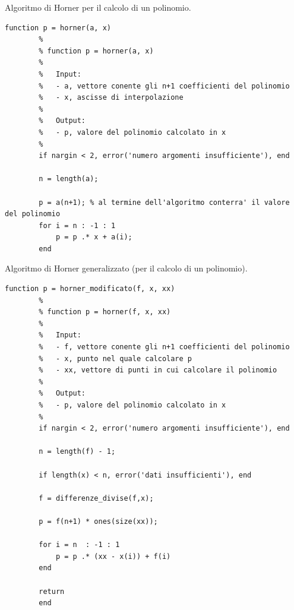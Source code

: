 \begin{algorithm}
\caption{Algoritmo di Horner per il calcolo di un polinomio.}\label{alg:metodo_horner}
    \begin{lstlisting}[style=Matlab-editor]
    	function p = horner(a, x)
    	%
    	% function p = horner(a, x)
    	%
    	%	Input: 
    	%	- a, vettore conente gli n+1 coefficienti del polinomio
    	%	- x, ascisse di interpolazione
    	%
    	%	Output:
    	%	- p, valore del polinomio calcolato in x
    	%
    	if nargin < 2, error('numero argomenti insufficiente'), end 
    	
    	n = length(a);
    	
        p = a(n+1); % al termine dell'algoritmo conterra' il valore del polinomio
        for i = n : -1 : 1
            p = p .* x + a(i);
        end
    \end{lstlisting}
\end{algorithm}

\begin{algorithm}
\caption{Algoritmo di Horner generalizzato (per il calcolo di un polinomio).}\label{alg:metodo_horner_modificato}
    \begin{lstlisting}[style=Matlab-editor]
    	function p = horner_modificato(f, x, xx)
    	% 
    	% function p = horner(f, x, xx)
    	%
    	%	Input: 
    	%	- f, vettore conente gli n+1 coefficienti del polinomio
    	%	- x, punto nel quale calcolare p
    	%	- xx, vettore di punti in cui calcolare il polinomio
    	%
    	%	Output:
    	%	- p, valore del polinomio calcolato in x
    	%
    	if nargin < 2, error('numero argomenti insufficiente'), end 
    	
    	n = length(f) - 1;
    	
    	if length(x) < n, error('dati insufficienti'), end
    	
    	f = differenze_divise(f,x);
    	
        p = f(n+1) * ones(size(xx));
        
        for i = n  : -1 : 1
            p = p .* (xx - x(i)) + f(i)
        end
        
        return
        end
    \end{lstlisting}
\end{algorithm}

